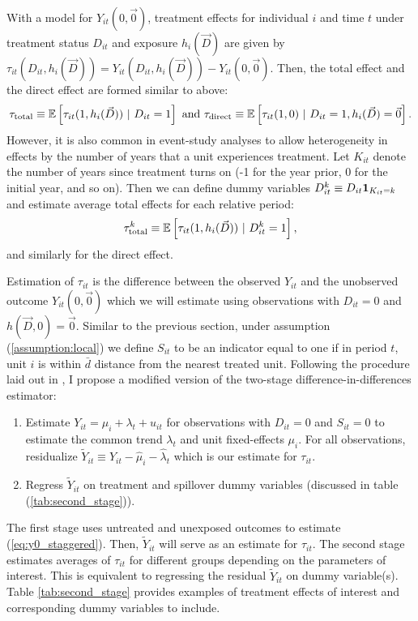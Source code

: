 \documentclass[11pt]{article}
\begin{document}
With a model for $Y_{it}(0, \vec{0})$, treatment effects for individual $i$ and time $t$ under treatment status $D_{it}$ and exposure $h_i(\vec{D})$ are given by $\tau_{it}(D_{it}, h_i(\vec{D})) = Y_{it}(D_{it}, h_i(\vec{D})) - Y_{it}(0, \vec{0})$. Then, the total effect and the direct effect are formed similar to above:
\[
    \tau_{\text{total}} \equiv \mathbb{E}\left[ \tau_{it}(1, h_i(\vec{D})) \ \vert \ D_{it} = 1\right] \text{ and }
    \tau_{\text{direct}} \equiv \mathbb{E}\left[ \tau_{it}(1, 0) \ \vert \ D_{it} = 1, h_i(\vec{D}) = \vec{0}\right].
\]
However, it is also common in event-study analyses to allow heterogeneity in effects by the number of years that a unit experiences treatment. Let $K_{it}$ denote the number of years since treatment turns on (-1 for the year prior, 0 for the initial year, and so on). Then we can define dummy variables $D_{it}^k \equiv D_{it} \mathbf{1}_{K_{it} = k}$ and estimate average total effects for each relative period: 
\[
    \tau_{\text{total}}^k \equiv \mathbb{E}\left[ \tau_{it}(1, h_i(\vec{D})) \ \vert \ D_{it}^k = 1\right],
\]
and similarly for the direct effect.

Estimation of $\tau_{it}$ is the difference between the observed $Y_{it}$ and the unobserved outcome $Y_{it}(0, \vec{0})$ which we will estimate using observations with $D_{it} = 0$ and $h(\vec{D}, 0) = \vec{0}$. Similar to the previous section, under assumption (\ref{assumption:local}) we define $S_{it}$ to be an indicator equal to one if in period $t$, unit $i$ is within $\bar{d}$ distance from the nearest treated unit. Following the procedure laid out in \citet{Gardner_2021}, I propose a modified version of the two-stage difference-in-differences estimator: 

\begin{enumerate}
    \item Estimate $Y_{it} = \mu_i + \lambda_t + u_{it}$ for observations with $D_{it} = 0$ and $S_{it} = 0$ to estimate the common trend $\lambda_t$ and unit fixed-effects $\mu_i$. For all observations, residualize $\tilde{Y}_{it} \equiv Y_{it} - \hat{\mu}_i - \hat{\lambda}_t$ which is our estimate for $\tau_{it}$.
    
    \item Regress $\tilde{Y}_{it}$ on treatment and spillover dummy variables (discussed in table (\ref{tab:second_stage})).
\end{enumerate}

The first stage uses untreated and unexposed outcomes to estimate (\ref{eq:y0_staggered}). Then, $\tilde{Y}_{it}$ will serve as an estimate for $\tau_{it}$. The second stage estimates averages of $\tau_{it}$ for different groups depending on the parameters of interest. This is equivalent to regressing the residual $\tilde{Y}_{it}$ on dummy variable(s). Table \ref{tab:second_stage} provides examples of treatment effects of interest and corresponding dummy variables to include. 
\end{document}
